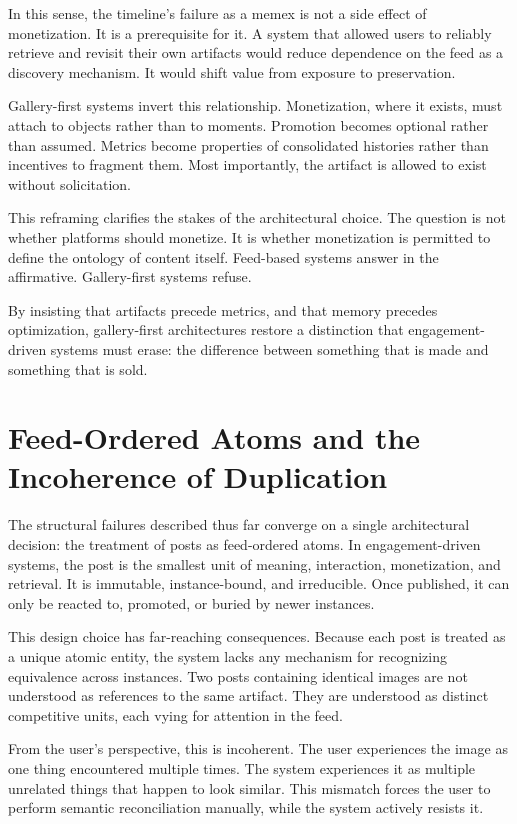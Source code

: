 \documentclass[11pt,oneside]{article}
\begin{document}
In this sense, the timeline’s failure as a memex is not a side effect of monetization. It is a prerequisite for it. A system that allowed users to reliably retrieve and revisit their own artifacts would reduce dependence on the feed as a discovery mechanism. It would shift value from exposure to preservation.

Gallery-first systems invert this relationship. Monetization, where it exists, must attach to objects rather than to moments. Promotion becomes optional rather than assumed. Metrics become properties of consolidated histories rather than incentives to fragment them. Most importantly, the artifact is allowed to exist without solicitation.

This reframing clarifies the stakes of the architectural choice. The question is not whether platforms should monetize. It is whether monetization is permitted to define the ontology of content itself. Feed-based systems answer in the affirmative. Gallery-first systems refuse.

By insisting that artifacts precede metrics, and that memory precedes optimization, gallery-first architectures restore a distinction that engagement-driven systems must erase: the difference between something that is made and something that is sold.

\section{Feed-Ordered Atoms and the Incoherence of Duplication}

The structural failures described thus far converge on a single architectural decision: the treatment of posts as feed-ordered atoms. In engagement-driven systems, the post is the smallest unit of meaning, interaction, monetization, and retrieval. It is immutable, instance-bound, and irreducible. Once published, it can only be reacted to, promoted, or buried by newer instances.

This design choice has far-reaching consequences. Because each post is treated as a unique atomic entity, the system lacks any mechanism for recognizing equivalence across instances. Two posts containing identical images are not understood as references to the same artifact. They are understood as distinct competitive units, each vying for attention in the feed.

From the user’s perspective, this is incoherent. The user experiences the image as one thing encountered multiple times. The system experiences it as multiple unrelated things that happen to look similar. This mismatch forces the user to perform semantic reconciliation manually, while the system actively resists it.
\end{document}
